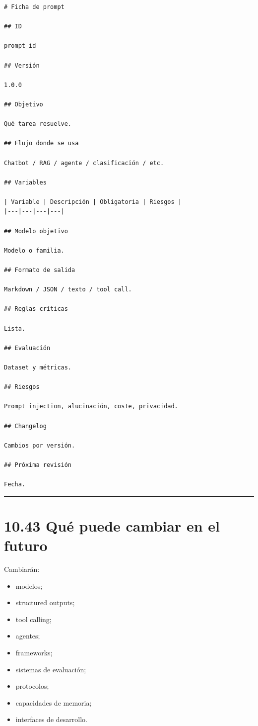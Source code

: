 \begin{lstlisting}
# Ficha de prompt

## ID

prompt_id

## Versión

1.0.0

## Objetivo

Qué tarea resuelve.

## Flujo donde se usa

Chatbot / RAG / agente / clasificación / etc.

## Variables

| Variable | Descripción | Obligatoria | Riesgos |
|---|---|---|---|

## Modelo objetivo

Modelo o familia.

## Formato de salida

Markdown / JSON / texto / tool call.

## Reglas críticas

Lista.

## Evaluación

Dataset y métricas.

## Riesgos

Prompt injection, alucinación, coste, privacidad.

## Changelog

Cambios por versión.

## Próxima revisión

Fecha.
\end{lstlisting}

\begin{center}\rule{0.5\linewidth}{0.5pt}\end{center}

\section{10.43 Qué puede cambiar en el
futuro}\label{quuxe9-puede-cambiar-en-el-futuro-9}

Cambiarán:

\begin{itemize}
\tightlist
\item
  modelos;
\item
  structured outputs;
\item
  tool calling;
\item
  agentes;
\item
  frameworks;
\item
  sistemas de evaluación;
\item
  protocolos;
\item
  capacidades de memoria;
\item
  interfaces de desarrollo.
\end{itemize}

